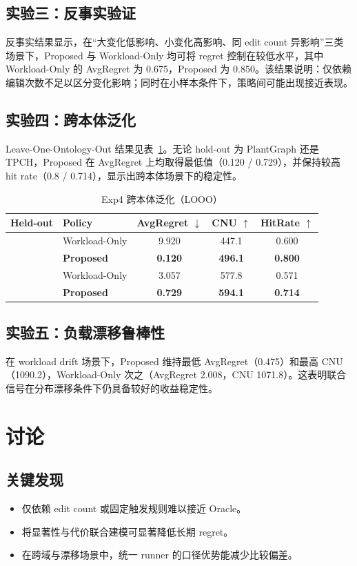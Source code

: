 \documentclass[12pt,a4paper]{ctexart}
\newcommand{\toprule}{\hline}
\newcommand{\midrule}{\hline}
\newcommand{\bottomrule}{\hline}
\newcommand{\multirow}[3]{##3}
\begin{document}
\subsection{实验三：反事实验证}
反事实结果显示，在“大变化低影响、小变化高影响、同 edit count 异影响”三类场景下，Proposed 与 Workload-Only 均可将 regret 控制在较低水平，其中 Workload-Only 的 AvgRegret 为 0.675，Proposed 为 0.850。该结果说明：仅依赖编辑次数不足以区分变化影响；同时在小样本条件下，策略间可能出现接近表现。

\subsection{实验四：跨本体泛化}
Leave-One-Ontology-Out 结果见表~\ref{tab:exp4}。无论 hold-out 为 PlantGraph 还是 TPCH，Proposed 在 AvgRegret 上均取得最低值（0.120 / 0.729），并保持较高 hit rate（0.8 / 0.714），显示出跨本体场景下的稳定性。

\begin{table}[H]
\centering
\caption{Exp4 跨本体泛化（LOOO）}
\label{tab:exp4}
\begin{tabular}{llccc}
\toprule
Held-out & Policy & AvgRegret $\downarrow$ & CNU $\uparrow$ & HitRate $\uparrow$ \\
\midrule
\multirow{2}{*}{PlantGraph} & Workload-Only & 9.920 & 447.1 & 0.600 \\
 & \textbf{Proposed} & \textbf{0.120} & \textbf{496.1} & \textbf{0.800} \\
\midrule
\multirow{2}{*}{TPCH} & Workload-Only & 3.057 & 577.8 & 0.571 \\
 & \textbf{Proposed} & \textbf{0.729} & \textbf{594.1} & \textbf{0.714} \\
\bottomrule
\end{tabular}
\end{table}

\subsection{实验五：负载漂移鲁棒性}
在 workload drift 场景下，Proposed 维持最低 AvgRegret（0.475）和最高 CNU（1090.2），Workload-Only 次之（AvgRegret 2.008，CNU 1071.8）。这表明联合信号在分布漂移条件下仍具备较好的收益稳定性。

\section{讨论}
\subsection{关键发现}
\begin{itemize}
  \item 仅依赖 edit count 或固定触发规则难以接近 Oracle。
  \item 将显著性与代价联合建模可显著降低长期 regret。
  \item 在跨域与漂移场景中，统一 runner 的口径优势能减少比较偏差。
\end{itemize}
\end{document}
